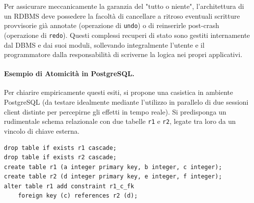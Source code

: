 Per assicurare meccanicamente la garanzia del "tutto o niente", l'architettura di un RDBMS deve possedere la facoltà di cancellare a ritroso eventuali scritture provvisorie già annotate (operazione di \texttt{undo}) o di reinserirle post-crash (operazione di \texttt{redo}). Questi complessi recuperi di stato sono gestiti internamente dal DBMS e dai suoi moduli, sollevando integralmente l'utente e il programmatore dalla responsabilità di scriverne la logica nei propri applicativi.

\paragraph{Esempio di Atomicità in PostgreSQL.}
Per chiarire empiricamente questi esiti, si propone una casistica in ambiente PostgreSQL (da testare idealmente mediante l'utilizzo in parallelo di due sessioni client distinte per percepirne gli effetti in tempo reale).
Si predisponga un rudimentale schema relazionale con due tabelle \texttt{r1} e \texttt{r2}, legate tra loro da un vincolo di chiave esterna.

\begin{verbatim}
drop table if exists r1 cascade;
drop table if exists r2 cascade;
create table r1 (a integer primary key, b integer, c integer);
create table r2 (d integer primary key, e integer, f integer);
alter table r1 add constraint r1_c_fk
    foreign key (c) references r2 (d);
\end{verbatim}

